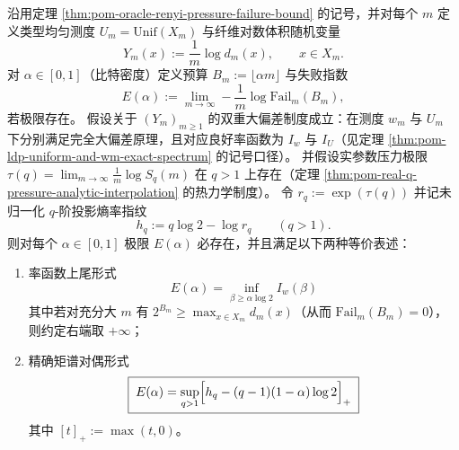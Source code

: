 \begin{theorem}\label{thm:pom-oracle-failure-exponent-duality-from-double-ldp}
沿用定理 \ref{thm:pom-oracle-renyi-pressure-failure-bound} 的记号，并对每个 \(m\) 定义类型均匀测度 \(U_m=\mathrm{Unif}(X_m)\) 与纤维对数体积随机变量
\[
Y_m(x):=\frac1m\log d_m(x),\qquad x\in X_m.
\]
对 \(\alpha\in[0,1]\)（比特密度）定义预算 \(B_m:=\lfloor \alpha m\rfloor\) 与失败指数
\[
E(\alpha):=\lim_{m\to\infty}-\frac1m\log \mathrm{Fail}_m(B_m),
\]
若极限存在。
假设关于 \((Y_m)_{m\ge 1}\) 的双重大偏差制度成立：在测度 \(w_m\) 与 \(U_m\) 下分别满足完全大偏差原理，且对应良好率函数为 \(I_w\) 与 \(I_U\)（见定理 \ref{thm:pom-ldp-uniform-and-wm-exact-spectrum} 的记号口径）。
并假设实参数压力极限 \(\tau(q)=\lim_{m\to\infty}\frac1m\log S_q(m)\) 在 \(q>1\) 上存在（定理 \ref{thm:pom-real-q-pressure-analytic-interpolation} 的热力学制度）。
令 \(r_q:=\exp(\tau(q))\) 并记未归一化 \(q\)-阶投影熵率指纹
\[
h_q:=q\log 2-\log r_q\qquad(q>1).
\]
则对每个 \(\alpha\in[0,1]\) 极限 \(E(\alpha)\) 必存在，并且满足以下两种等价表述：
\begin{enumerate}
  \item 率函数上尾形式
  \[
  \boxed{\;
  E(\alpha)=\inf_{\beta\ge \alpha\log 2} I_w(\beta)\;}
  \]
  其中若对充分大 \(m\) 有 \(2^{B_m}\ge \max_{x\in X_m} d_m(x)\)（从而 \(\mathrm{Fail}_m(B_m)=0\)），则约定右端取 \(+\infty\)；
  \item 精确矩谱对偶形式
  \[
  \boxed{\;
  E(\alpha)=\sup_{q>1}\Bigl[h_q-(q-1)(1-\alpha)\log 2\Bigr]_+\;}
  \]
  其中 \([t]_+:=\max(t,0)\)。
\end{enumerate}
\end{theorem}
